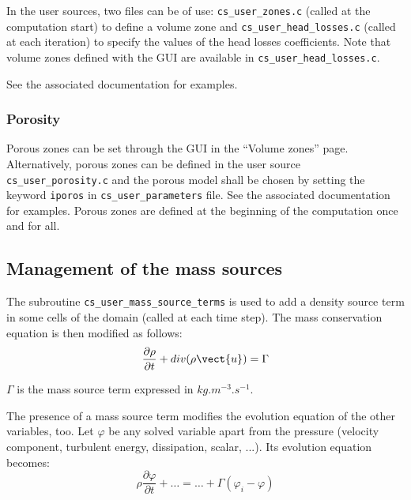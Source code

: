 {{{In the user sources, two files can be of use: \texttt{cs\_user\_zones.c} (called at the computation start) to define a volume zone and \texttt{cs\_user\_head\_losses.c} (called at each iteration) to specify the values of the head losses coefficients. Note that volume zones defined with the GUI are available in \texttt{cs\_user\_head\_losses.c}.

See the associated  documentation for examples.

\subsubsection{Porosity}

Porous zones can be set through the GUI in the ``Volume zones'' page. Alternatively, porous zones can be defined in the user source
\texttt{cs\_user\_porosity.c} and the porous model shall be chosen by setting the keyword \texttt{iporos} in
\texttt{cs\_user\_parameters} file. See the associated  documentation for examples.
Porous zones are defined at the beginning of the computation once and for all.\\

\subsection{Management of the mass sources}

The subroutine \texttt{cs\_user\_mass\_source\_terms} is used to add a density source term in some cells of
the domain (called at each time step). The mass conservation equation is then modified as follows:
\begin{displaymath}
\frac{\partial \rho}{\partial t} + div(\rho\vect{u})=\Gamma
\end{displaymath}

$\Gamma$ is the mass source term expressed in $kg.m^{-3}.s^{-1}$.

The presence of a mass source term modifies the evolution equation of
the other variables, too. Let $\varphi$ be any solved variable apart
from the pressure (velocity component, turbulent energy, dissipation,
scalar, ...). Its evolution equation becomes:
\begin{displaymath}
\rho\frac{\partial \varphi}{\partial t} + \ldots = \ldots + \Gamma(\varphi_i-\varphi)
\end{displaymath}

}}}
